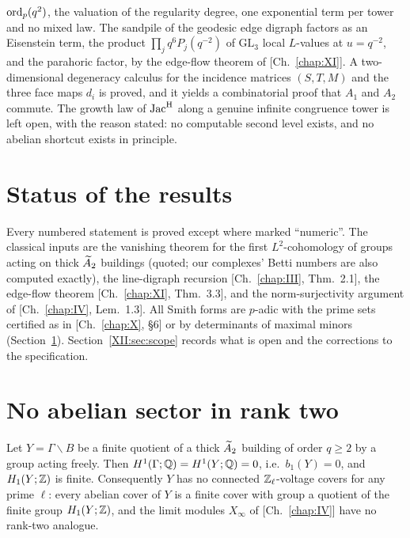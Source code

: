 \begin{chapterabstract}
$\operatorname{ord}_p(q^{2})$, the valuation of the regularity degree, one exponential term per tower and
no mixed law. The sandpile of the geodesic edge digraph factors as an Eisenstein term, the
product $\prod_jq^{6}P_j(q^{-2})$ of $\mathrm{GL}_3$ local $L$-values at $u=q^{-2}$, and the
parahoric factor, by the edge-flow theorem of [Ch.~\ref{chap:XI}]. A two-dimensional degeneracy calculus for
the incidence matrices $(S,T,M)$ and the three face maps $d_i$ is proved, and it yields a
combinatorial proof that $A_1$ and $A_2$ commute. The growth law of $\operatorname{Jac}^{\mathrm{H}}$ along a genuine
infinite congruence tower is left open, with the reason stated: no computable second level
exists, and no abelian shortcut exists in principle.
\end{chapterabstract}

\section*{Status of the results}

Every numbered statement is proved except where marked ``numeric''. The classical inputs
are the vanishing theorem for the first $L^{2}$-cohomology of groups acting on thick
$\widetilde A_2$ buildings \cite{Ga,BSw} (quoted; our complexes' Betti numbers are also computed
exactly), the line-digraph recursion [Ch.~\ref{chap:III}, Thm.~2.1], the edge-flow theorem [Ch.~\ref{chap:XI}, Thm.~3.3],
and the norm-surjectivity argument of [Ch.~\ref{chap:IV}, Lem.~1.3]. All Smith forms are $p$-adic with the
prime sets certified as in [Ch.~\ref{chap:X}, \S6] or by determinants of maximal minors
(Section~\ref{XII:sec:noabelian}). Section~\ref{XII:sec:scope} records what is open and the
corrections to the specification.

\section{No abelian sector in rank two}\label{XII:sec:noabelian}

\begin{theorem}\label{XII:thm:noabelian}
Let $Y=\Gamma\backslash B$ be a finite quotient of a thick $\widetilde A_2$ building of order
$q\ge2$ by a group acting freely. Then $H^{1}(\Gamma;\mathbb{Q})=H^{1}(Y;\mathbb{Q})=0$, i.e.\ $b_1(Y)=0$,
and $H_1(Y;\mathbb{Z})$ is finite. Consequently $Y$ has no connected $\mathbb{Z}_\ell$-voltage covers for
any prime $\ell$: every abelian cover of $Y$ is a finite cover with group a quotient of the
finite group $H_1(Y;\mathbb{Z})$, and the limit modules $X_\infty$ of {\rm[Ch.~\ref{chap:IV}]} have no rank-two
analogue.
\end{theorem}

